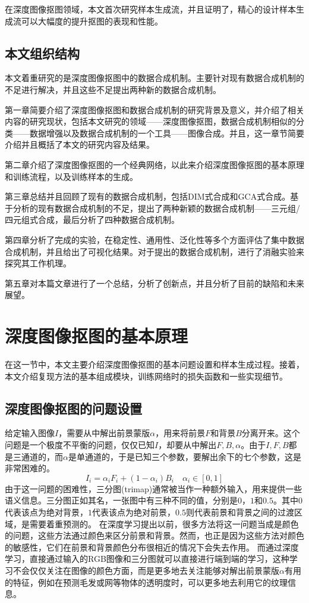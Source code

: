 \documentclass[supercite]{HustGraduPaper}
\begin{document}
    在深度图像抠图领域，本文首次研究样本生成流，并且证明了，精心的设计样本生成流可以大幅度的提升抠图的表现和性能。
	
	\subsection{本文组织结构}
	本文着重研究的是深度图像抠图中的数据合成机制。主要针对现有数据合成机制的不足进行解决，并且这些不足提出两种新的数据合成机制。

	第一章简要介绍了深度图像抠图和数据合成机制的研究背景及意义，并介绍了相关内容的研究现状，包括本文研究的领域——深度图像抠图，数据合成机制相似的分类——数据增强以及数据合成机制的一个工具——图像合成。并且，这一章节简要介绍并且概括了本文的研究内容及结果。

	第二章介绍了深度图像抠图的一个经典网络，以此来介绍深度图像抠图的基本原理和训练流程，以及训练样本的生成。

	第三章总结并且回顾了现有的数据合成机制，包括DIM式合成和GCA式合成。基于分析的现有数据合成机制的不足，提出了两种新颖的数据合成机制——三元组/四元组式合成，最后分析了四种数据合成机制。

	第四章分析了完成的实验，在稳定性、通用性、泛化性等多个方面评估了集中数据合成机制，并且给出了可视化结果。对于提出的数据合成机制，进行了消融实验来探究其工作机理。

	第五章对本篇文章进行了一个总结，分析了创新点，并且分析了目前的缺陷和未来展望。



    \section{深度图像抠图的基本原理}
    在这一节中，本文主要介绍深度图像抠图的基本问题设置和样本生成过程。接着，本文介绍复现方法的基本组成模块，训练网络时的损失函数和一些实现细节。

	
    \subsection{深度图像抠图的问题设置}
    给定输入图像$I$，需要从中解出前景蒙版$\alpha$，用来将前景$F$和背景$B$分离开来。这个问题是一个极度不平衡的问题，仅仅已知$I$，却要从中解出$F,B,\alpha$。由于$I,F,B$都是三通道的，而$\alpha$是单通道的，于是已知三个参数，要解出余下的七个参数，这是非常困难的。
    \begin{equation}
        I_{i}=\alpha_{i} F_{i}+\left(1-\alpha_{i}\right) B_{i} \quad \alpha_{i} \in[0,1]
    \end{equation}
    由于这一问题的困难性，三分图(trimap)通常被当作一种额外输入，用来提供一些语义信息。三分图正如其名，一张图中有三种不同的值，分别是$0$，$1$和$0.5$。其中$0$代表该点为绝对背景，$1$代表该点为绝对前景，$0.5$则代表前景和背景之间的过渡区域，是需要着重预测的。
    在深度学习提出以前，很多方法将这一问题当成是颜色的问题，这些方法通过颜色来区分前景和背景。然而，也正是因为这些方法对颜色的敏感性，它们在前景和背景颜色分布很相近的情况下会失去作用。
    而通过深度学习，直接通过输入的RGB图像和三分图就可以直接进行端到端的学习，这种学习不会仅仅关注在图像的颜色方面，而是更多地去关注能够对解出前景蒙版$\alpha$有用的特征，例如在预测毛发或网等物体的透明度时，可以更多地去利用它的纹理信息。
\end{document}
